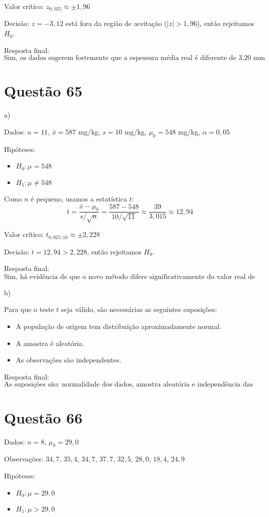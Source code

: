 \documentclass[12pt]{article}
\newcommand{\quest}[1]{\section*{Questão #1}} %
\begin{document}
Valor cr\'itico: $z_{0{,}025} \approx \pm 1{,}96$

Decis\~ao: $z = -3{,}12$ est\'a fora da regi\~ao de aceita\c{c}\~ao ($|z| > 1{,}96$), ent\~ao rejeitamos $H_0$.

Resposta final:
\[
\boxed{\text{Sim, os dados sugerem fortemente que a espessura m\'edia real \'{e} diferente de 3{,}20 mm}}
\]

\quest{65}

a)

Dados: $n = 11$, $\bar{x} = 587$ mg/kg, $s = 10$ mg/kg, $\mu_0 = 548$ mg/kg, $\alpha = 0{,}05$

Hipóteses:
\begin{itemize}
  \item $H_0: \mu = 548$
  \item $H_1: \mu \neq 548$
\end{itemize}

Como $n$ é pequeno, usamos a estatística $t$:
\[
t = \frac{\bar{x} - \mu_0}{s / \sqrt{n}} = \frac{587 - 548}{10 / \sqrt{11}} \approx \frac{39}{3{,}015} \approx 12{,}94
\]

Valor crítico: $t_{0{,}025; 10} \approx \pm 2{,}228$

Decisão: $t = 12{,}94 > 2{,}228$, então rejeitamos $H_0$.

Resposta final:
\[
\boxed{\text{Sim, há evidência de que o novo método difere significativamente do valor real de 548 mg/kg}}
\]

b)

Para que o teste $t$ seja válido, são necessárias as seguintes suposições:
\begin{itemize}
  \item A população de origem tem distribuição aproximadamente normal.
  \item A amostra é aleatória.
  \item As observações são independentes.
\end{itemize}

Resposta final:
\[
\boxed{\text{As suposições são: normalidade dos dados, amostra aleatória e independência das observações}}
\]

\quest{66}

Dados: $n = 8$, $\mu_0 = 29{,}0$

Observações: $34{,}7$, $35{,}4$, $34{,}7$, $37{,}7$, $32{,}5$, $28{,}0$, $18{,}4$, $24{,}9$

Hipóteses:
\begin{itemize}
  \item $H_0: \mu = 29{,}0$
  \item $H_1: \mu > 29{,}0$
\end{itemize}
\end{document}
